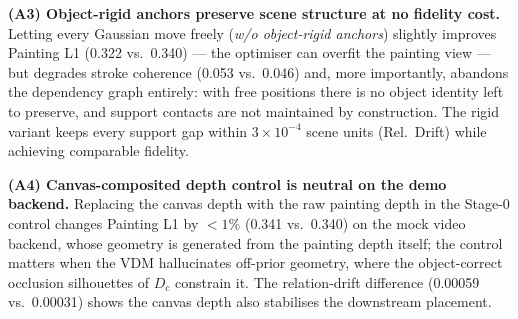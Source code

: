 \documentclass[10pt,twocolumn,letterpaper]{article}
\begin{document}
\textbf{(A3) Object-rigid anchors preserve scene structure at no fidelity
cost.} Letting every Gaussian move freely (\emph{w/o object-rigid anchors})
slightly improves Painting L1 (0.322 vs.\ 0.340) --- the optimiser can
overfit the painting view --- but degrades stroke coherence (0.053 vs.\
0.046) and, more importantly, abandons the dependency graph entirely: with
free positions there is no object identity left to preserve, and support
contacts are not maintained by construction. The rigid variant keeps every
support gap within $3\times10^{-4}$ scene units (Rel.\ Drift) while
achieving comparable fidelity.

\textbf{(A4) Canvas-composited depth control is neutral on the demo
backend.} Replacing the canvas depth with the raw painting depth in the
Stage-0 control changes Painting L1 by $<1\%$ (0.341 vs.\ 0.340) on the
mock video backend, whose geometry is generated from the painting depth
itself; the control matters when the VDM hallucinates off-prior geometry,
where the object-correct occlusion silhouettes of $D_c$ constrain it. The
relation-drift difference (0.00059 vs.\ 0.00031) shows the canvas depth
also stabilises the downstream placement.
\end{document}
